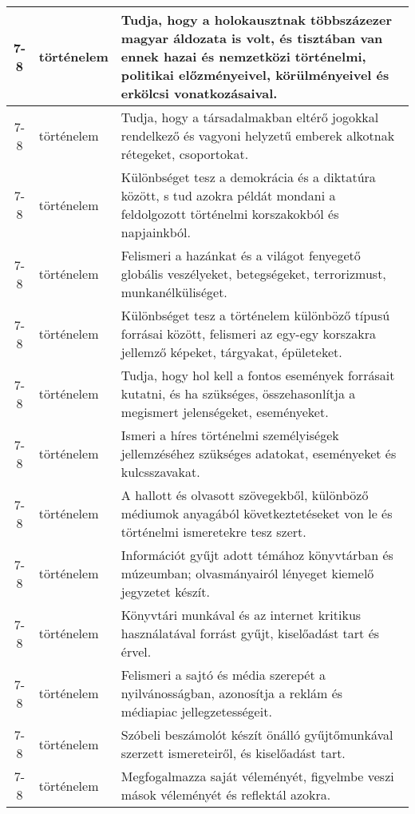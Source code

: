 \begin{small}
\begin{longtable}{c | p{2cm} |  p{11cm} }
              7-8 & történelem & Tudja, hogy a holokausztnak többszázezer magyar áldozata is volt, és  tisztában van ennek hazai és nemzetközi történelmi, politikai előzményeivel, körülményeivel és erkölcsi vonatkozásaival. \\ \hline
              7-8 & történelem & Tudja, hogy a társadalmakban eltérő jogokkal rendelkező és vagyoni helyzetű emberek alkotnak rétegeket, csoportokat. \\ \hline
              7-8 & történelem & Különbséget tesz a demokrácia és a diktatúra között, s tud azokra példát mondani a feldolgozott történelmi korszakokból és napjainkból. \\ \hline
              7-8 & történelem & Felismeri a hazánkat és a világot fenyegető globális veszélyeket, betegségeket, terrorizmust, munkanélküliséget. \\ \hline
              7-8 & történelem & Különbséget tesz a történelem különböző típusú forrásai között, felismeri az egy-egy korszakra jellemző képeket, tárgyakat, épületeket. \\ \hline
              7-8 & történelem & Tudja, hogy hol kell a fontos események forrásait kutatni, és ha szükséges, összehasonlítja a megismert jelenségeket, eseményeket. \\ \hline
              7-8 & történelem & Ismeri a híres történelmi személyiségek jellemzéséhez szükséges adatokat, eseményeket és kulcsszavakat. \\ \hline
              7-8 & történelem & A hallott és olvasott szövegekből, különböző médiumok anyagából következtetéseket von le és történelmi ismeretekre tesz szert. \\ \hline
              7-8 & történelem & Információt gyűjt adott témához könyvtárban és múzeumban; olvasmányairól lényeget kiemelő jegyzetet készít. \\ \hline
              7-8 & történelem & Könyvtári munkával és az internet kritikus használatával forrást gyűjt, kiselőadást tart és érvel. \\ \hline
              7-8 & történelem & Felismeri a sajtó és média szerepét a nyilvánosságban, azonosítja a reklám és médiapiac jellegzetességeit. \\ \hline
              7-8 & történelem & Szóbeli beszámolót készít önálló gyűjtőmunkával szerzett ismereteiről, és kiselőadást tart. \\ \hline
              7-8 & történelem & Megfogalmazza saját véleményét, figyelmbe veszi mások véleményét és reflektál azokra. \\ \hline

\end{longtable}
\end{small}
